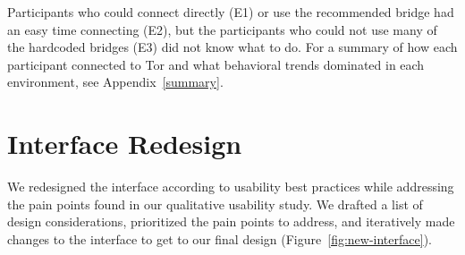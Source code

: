 \documentclass[USenglish,oneside,twocolumn]{article}
\begin{document}
Participants who could connect directly (E1) or use the recommended bridge had an easy time connecting (E2), but the participants who could not use many of the hardcoded bridges (E3) did not know what to do. For a summary of how each participant connected to Tor and what behavioral trends dominated in each environment, see Appendix~\ref{summary}. 

\section{Interface Redesign}
\label{sec:design} 
We redesigned the interface according to usability best practices while addressing the pain points found in our qualitative usability study. We drafted a list of design considerations, prioritized the pain points to address, and iteratively made changes to the interface to get to our final design (Figure~\ref{fig:new-interface}).
\end{document}
